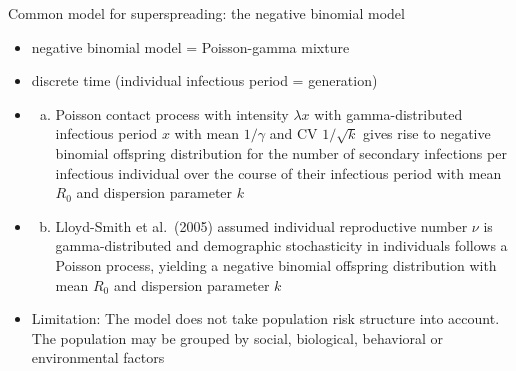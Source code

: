 \documentclass[
  ignorenonframetext,
]{beamer}
\providecommand{\tightlist}{%
  \setlength{\itemsep}{0pt}\setlength{\parskip}{0pt}}
\begin{document}
\begin{frame}{Common model for superspreading: the negative binomial
model}
\protect\hypertarget{common-model-for-superspreading-the-negative-binomial-model}{}
\begin{itemize}
\item
  negative binomial model = Poisson-gamma mixture
\item
  discrete time (individual infectious period = generation)
\item
  \begin{enumerate}
  [a)]
  \tightlist
  \item
    Poisson contact process with intensity \(\lambda x\) with
    gamma-distributed infectious period \(x\) with mean \(1/\gamma\) and
    CV \(1/\sqrt{k}\) gives rise to negative binomial offspring
    distribution for the number of secondary infections per infectious
    individual over the course of their infectious period with mean
    \(R_0\) and dispersion parameter \(k\)
  \end{enumerate}
\item
  \begin{enumerate}
  [a)]
  \setcounter{enumi}{1}
  \tightlist
  \item
    Lloyd-Smith et al.~(2005) assumed individual reproductive number
    \(\nu\) is gamma-distributed and demographic stochasticity in
    individuals follows a Poisson process, yielding a negative binomial
    offspring distribution with mean \(R_0\) and dispersion parameter
    \(k\)
  \end{enumerate}
\item
  Limitation: The model does not take population risk structure into
  account. The population may be grouped by social, biological,
  behavioral or environmental factors
\end{itemize}
\end{frame}
\end{document}
